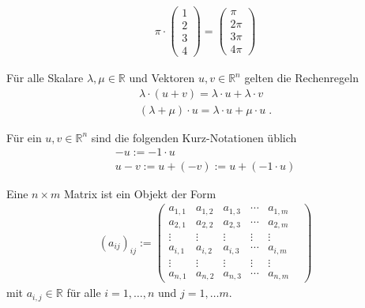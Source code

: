 \begin{Beispiel}
 
\begin{align*}
\pi \cdot
\begin{pmatrix}
1 \\ 2  \\  3 \\ 4
\end{pmatrix}  
=  \begin{pmatrix}
\pi   \\ 2  \pi  \\  3 \pi \\  4  \pi
\end{pmatrix} 
\end{align*}

\begin{Bemerkung}
Für alle Skalare $\lambda, \mu \in \mathbb{R}$ und Vektoren $u,v \in  \mathbb{R}^n$ gelten die  Rechenregeln
\begin{align*}
\lambda \cdot (u +v) = \lambda \cdot u + \lambda \cdot v \\
(\lambda + \mu)  \cdot u  = \lambda  \cdot u + \mu  \cdot u \; .
\end{align*}
\end{Bemerkung}

\begin{Definition}
Für ein $u,v \in  \mathbb{R}^n$ sind die folgenden Kurz-Notationen üblich
\begin{align*}
-u :=  -1 \cdot u \\
u -v := u + (-v) := u + (-1 \cdot u) 
\end{align*}  
\end{Definition}
\end{Beispiel}

\begin{Definition}
Eine $n \times m$ Matrix ist ein Objekt der Form
\begin{align*}
(a_{ij})_{ij} := \begin{pmatrix}
a_{1,1} &  a_{1,2} & a_{1,3} & \cdots & a_{1,m}   \\  
a_{2,1} &  a_{2,2} & a_{2,3} & \cdots & a_{2,m} \\  
 \vdots &  \vdots &\vdots & \vdots & \vdots & \\ 
a_{i,1} &  a_{i,2} & a_{i,3} & \cdots & a_{i,m} \\
 \vdots &  \vdots &\vdots & \vdots & \vdots & \\ 
a_{n,1} &  a_{n,2} & a_{n,3} & \cdots & a_{n,m}  
\end{pmatrix}  
\end{align*} 
mit $a_{i,j} \in \mathbb{R}$ für alle $i = 1, \hdots, n$ und $j = 1, \hdots m$.
\end{Definition}


